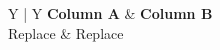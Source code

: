 \begin{table}[t]
\centering
\caption{Example table placeholder.}
\label{tab:example}
\begin{tabularx}{\linewidth}{Y | Y}
\toprule
\textbf{Column A} & \textbf{Column B} \\
\midrule
Replace & Replace \\
\bottomrule
\end{tabularx}
\end{table}
